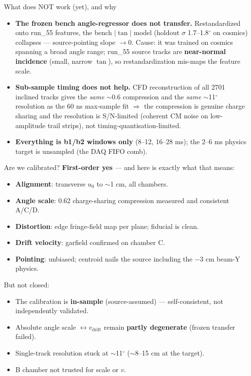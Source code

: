 \documentclass[aspectratio=169,10pt]{beamer}
\begin{document}
\begin{frame}{What does NOT work (yet), and why}
\begin{itemize}
\item \textbf{The frozen bench angle-regressor does not transfer.} Restandardized
      onto run\_55 features, the bench $|\tan|$ model (holdout $\sigma$
      1.7--1.8$^\circ$ on cosmics) collapses --- source-pointing slope $\to0$.
      Cause: it was trained on cosmics spanning a broad angle range; run\_55
      source tracks are \textbf{near-normal incidence} (small, narrow $\tan$), so
      restandardization mis-maps the feature scale.
\item \textbf{Sub-sample timing does not help.} CFD reconstruction of all 2701
      inclined tracks gives the \emph{same} $\sim$0.6 compression and the
      \emph{same} $\sim$11$^\circ$ resolution as the 60 ns max-sample fit
      $\Rightarrow$ the compression is genuine charge sharing and the resolution
      is S/N-limited (coherent CM noise on low-amplitude trail strips), not
      timing-quantisation-limited.
\item \textbf{Everything is b1/b2 windows only} (8--12, 16--28 ms); the 2--6 ms
      physics target is unsampled (the DAQ FIFO comb).
\end{itemize}
\end{frame}

\begin{frame}{Are we calibrated?}
\textbf{First-order yes} --- and here is exactly what that means:
\begin{itemize}
\item[\checkmark] \textbf{Alignment}: transverse $u_0$ to $\sim$1 cm, all chambers.
\item[\checkmark] \textbf{Angle scale}: 0.62 charge-sharing compression measured
      and consistent A/C/D.
\item[\checkmark] \textbf{Distortion}: edge fringe-field map per plane; fiducial
      is clean.
\item[\checkmark] \textbf{Drift velocity}: garfield confirmed on chamber C.
\item[\checkmark] \textbf{Pointing}: unbiased; centroid nails the source
      including the $-3$ cm beam-Y physics.
\end{itemize}
\alert{But not closed:}
\begin{itemize}
\item[$\triangleright$] The calibration is \textbf{in-sample} (source-assumed)
      --- self-consistent, not independently validated.
\item[$\triangleright$] Absolute angle scale $\leftrightarrow v_\mathrm{drift}$
      remain \textbf{partly degenerate} (frozen transfer failed).
\item[$\triangleright$] Single-track resolution stuck at $\sim$11$^\circ$
      ($\sim$8--15 cm at the target).
\item[$\triangleright$] B chamber not trusted for scale or $v$.
\end{itemize}
\end{frame}
\end{document}
